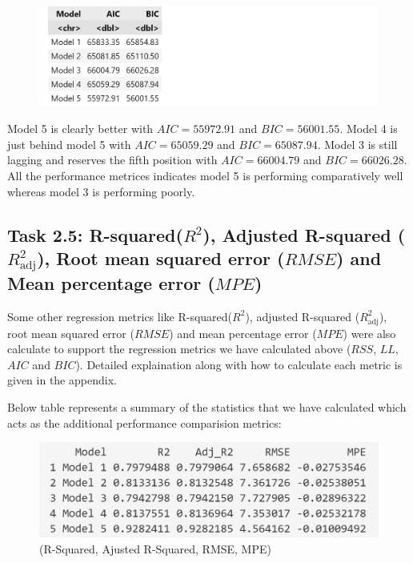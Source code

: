 \documentclass[12pt,a4paper]{article}
\begin{document}

\begin{figure}[H]
  \centering
  \includegraphics[width=\textwidth]{m6.png}
\end{figure}

Model 5 is clearly better with $AIC= 55972.91$ and $BIC=	56001.55$. Model 4 
is just behind model 5 with $AIC= 65059.29$	and $BIC= 65087.94$. Model 3 is still 
lagging and reserves the fifth position with $AIC= 66004.79$	and $BIC= 66026.28$. 
All the performance metrices indicates model 5 is performing 
comparatively well whereas model 3 is performing poorly. 


\subsection*{Task 2.5: R-squared($R^2$), Adjusted R-squared ($R^2_{\text{adj}}$), Root mean squared error ($RMSE$) and Mean percentage error ($MPE$)}

Some other regression metrics like R-squared($R^2$), adjusted R-squared ($R^2_{\text{adj}}$), 
root mean squared error ($RMSE$) and mean percentage error ($MPE$) were also calculate to support the 
regression metrics we have calculated above ($RSS$, $LL$, $AIC$ and $BIC$). Detailed explaination 
along with how to calculate each metric is given in the appendix.


Below table represents a summary of the statistics that we have calculated which acts as 
the additional performance comparision metrics: 

\begin{figure}[H]
  \centering
  \includegraphics[width=\textwidth]{y5.png}
  \caption{(R-Squared, Ajusted R-Squared, RMSE, MPE)}
  \label{fig:Comparision Table}
\end{figure}
\end{document}
